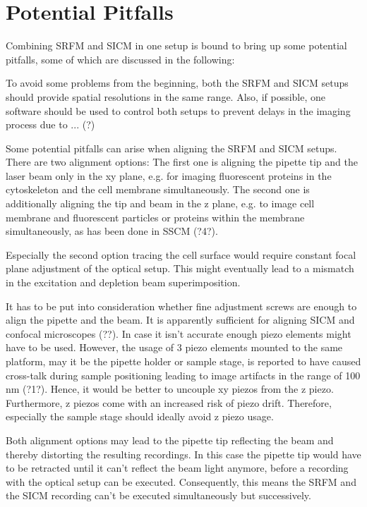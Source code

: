 \section{Potential Pitfalls}
\label{sec:pitfalls}
Combining SRFM and SICM in one setup is bound to bring up some potential
pitfalls, some of which are discussed in the following:

To avoid some problems from the beginning, both the SRFM and SICM setups
should provide spatial resolutions in the same range. Also, if possible, one
software should be used to control both setups to prevent delays in the
imaging process due to ... (?)

Some potential pitfalls can arise when aligning the SRFM and SICM
setups. There are two alignment options: The first one is aligning the pipette
tip and the laser beam only in the xy plane, e.g. for imaging fluorescent
proteins in the cytoskeleton and the cell membrane simultaneously. The second
one is additionally aligning the tip and beam in the z plane, e.g. to image
cell membrane and fluorescent particles or proteins within the membrane
simultaneously, as has been done in SSCM (?4?).

Especially the second option tracing the cell surface would require constant
focal plane adjustment of the optical setup. This might eventually lead to a
mismatch in the excitation and depletion beam superimposition.

It has to be put into consideration whether fine adjustment screws are enough
to align the pipette and the beam. It is apparently sufficient for aligning
SICM and confocal microscopes (??). In case it isn't accurate enough piezo
elements might have to be used. However, the usage of 3 piezo elements mounted
to the same platform, may it be the pipette holder or sample stage, is
reported to have caused cross-talk during sample positioning leading to image
artifacts in the range of 100 nm (?1?). Hence, it would be better to uncouple
xy piezos from the z piezo. Furthermore, z piezos come with an increased risk
of piezo drift. Therefore, especially the sample stage should ideally avoid z
piezo usage.

Both alignment options may lead to the pipette tip reflecting the beam and
thereby distorting the resulting recordings. In this case the pipette tip
would have to be retracted until it can't reflect the beam light anymore,
before a recording with the optical setup can be executed. Consequently, this
means the SRFM and the SICM recording can't be executed simultaneously but
successively.

